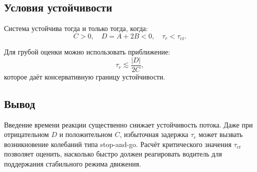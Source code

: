 \subsection{ Условия устойчивости}

Система устойчива тогда и только тогда, когда:
\[
\boxed{
	C > 0, \quad D = A + 2B < 0, \quad \tau_r < \tau_{\mathrm{cr}}.
}
\]

Для грубой оценки можно использовать приближение:
\[
\tau_r \lesssim \frac{|D|}{2C},
\]
которое даёт консервативную границу устойчивости.

\subsection*{Вывод}
Введение времени реакции существенно снижает устойчивость потока.
Даже при отрицательном $D$ и положительном $C$, избыточная задержка $\tau_r$ может вызвать возникновение колебаний типа stop-and-go. Расчёт критического значения $\tau_{\mathrm{cr}}$ позволяет оценить, насколько быстро должен реагировать водитель для поддержания стабильного режима движения.
